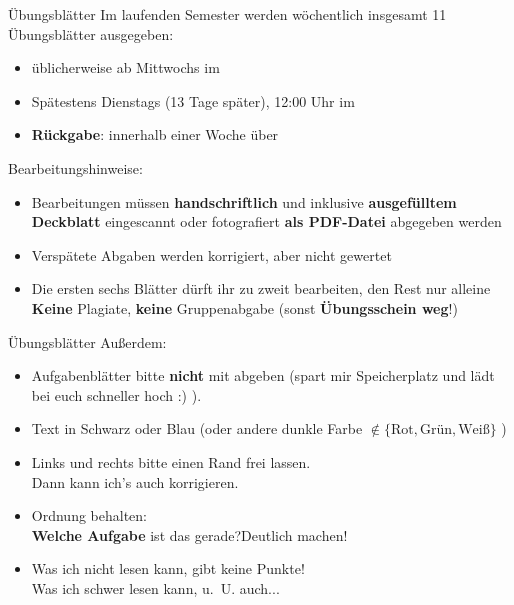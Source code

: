\begin{frame}{Übungsblätter}
	Im laufenden Semester werden wöchentlich insgesamt 11 Übungsblätter ausgegeben:
	\begin{itemize}
		\item {} üblicherweise ab Mittwochs im \ILIAS \\
		\item {} Spätestens Dienstags (13 Tage später), 12:00 Uhr im \ILIAS
		\item \textbf{Rückgabe}: innerhalb einer Woche über \ILIAS
	\end{itemize}		
	\pause
	Bearbeitungshinweise:
	\begin{itemize}
		\item Bearbeitungen müssen \textbf{handschriftlich} und inklusive \textbf{ausgefülltem Deckblatt} eingescannt oder fotografiert \textbf{als PDF-Datei} abgegeben werden \\
		\pause
		\item Verspätete Abgaben werden korrigiert, aber nicht gewertet
		\pause
		\item Die ersten sechs Blätter dürft ihr zu zweit bearbeiten, den Rest nur alleine
		\implitem \textbf{Keine} Plagiate, \textbf{keine} Gruppenabgabe (sonst \textbf{Übungsschein weg}!)
	\end{itemize}
\end{frame}

\begin{frame}{Übungsblätter}
	Außerdem:
	\begin{itemize}
		\item Aufgabenblätter bitte \textbf{nicht} mit abgeben (spart mir Speicherplatz und lädt bei euch schneller hoch :) ).
		\item Text in Schwarz oder Blau (oder andere dunkle Farbe $\notin \{\text{Rot}, \text{Grün}, \text{Weiß}\}$ )	
		\item Links und rechts bitte einen Rand frei lassen. \\
			  Dann kann ich's auch korrigieren. \smiley
		\item Ordnung behalten: \\
			  \textbf{Welche Aufgabe} ist das gerade?\quad \impl Deutlich machen!
		\item Was ich nicht lesen kann, gibt keine Punkte! \\
			  \small Was ich schwer lesen kann, u.~U. auch... 
	\end{itemize}
\end{frame}



